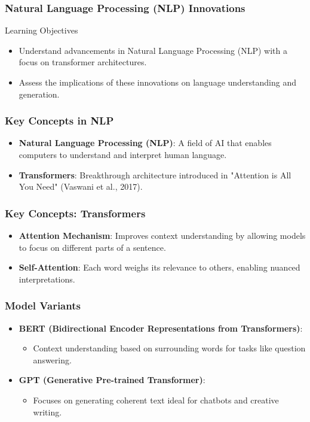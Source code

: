\documentclass[aspectratio=169]{beamer}
\begin{document}
\begin{frame}
    \frametitle{Natural Language Processing (NLP) Innovations}
    \begin{block}{Learning Objectives}
        \begin{itemize}
            \item Understand advancements in Natural Language Processing (NLP) with a focus on transformer architectures.
            \item Assess the implications of these innovations on language understanding and generation.
        \end{itemize}
    \end{block}
\end{frame}

\begin{frame}
    \frametitle{Key Concepts in NLP}
    \begin{itemize}
        \item \textbf{Natural Language Processing (NLP)}: A field of AI that enables computers to understand and interpret human language.
        \item \textbf{Transformers}: Breakthrough architecture introduced in "Attention is All You Need" (Vaswani et al., 2017).
    \end{itemize}
\end{frame}

\begin{frame}
    \frametitle{Key Concepts: Transformers}
    \begin{itemize}
        \item \textbf{Attention Mechanism}: Improves context understanding by allowing models to focus on different parts of a sentence.
        \item \textbf{Self-Attention}: Each word weighs its relevance to others, enabling nuanced interpretations.
    \end{itemize}
\end{frame}

\begin{frame}
    \frametitle{Model Variants}
    \begin{itemize}
        \item \textbf{BERT (Bidirectional Encoder Representations from Transformers)}:
            \begin{itemize}
                \item Context understanding based on surrounding words for tasks like question answering.
            \end{itemize}
        \item \textbf{GPT (Generative Pre-trained Transformer)}:
            \begin{itemize}
                \item Focuses on generating coherent text ideal for chatbots and creative writing.
            \end{itemize}
    \end{itemize}
\end{frame}
\end{document}
